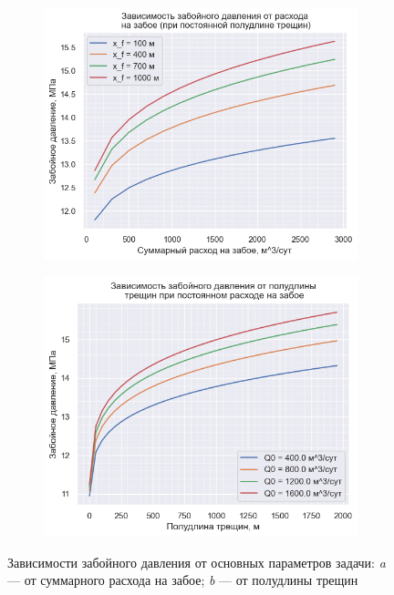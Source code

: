 \begin{figure}[H]
	\begin{subfigure}[t]{\dimexpr.5\linewidth-1.3em\relax}
		\centering
		\includegraphics[width=.95\linewidth,valign=t]{images/p_0(q_0).png}
	\end{subfigure}
\hfill %
	\begin{subfigure}[t]{\dimexpr.5\linewidth-1.3em\relax}
		\centering
		\includegraphics[width=.95\linewidth,valign=t]{images/p_0(x_f).png}
	\end{subfigure}
\captionsetup{justification=centering} %
\caption{Зависимости забойного давления от основных параметров задачи: {\itshape a} --- от суммарного расхода на забое; {\itshape b} --- от полудлины трещин} 
\label{fig:results1}
\end{figure}

